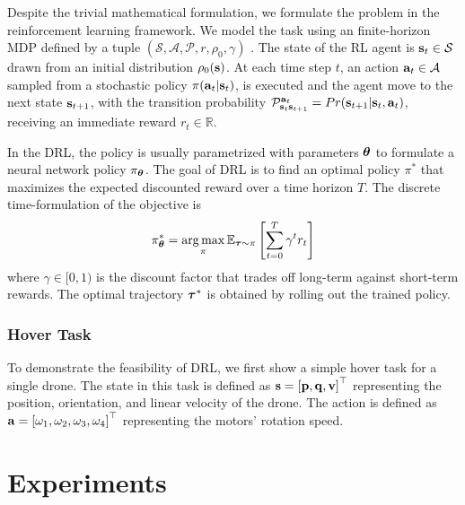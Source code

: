 \documentclass[letterpaper,journal,twoside]{IEEEtran}
\begin{document}
Despite the trivial mathematical formulation, 
we formulate the problem in the reinforcement learning 
framework. 
We model the task using an finite-horizon MDP 
defined by a tuple $\left(
  \mathcal{S}, 
  \mathcal{A}, 
  \mathcal{P}, 
  r, \rho_0, \gamma
\right)$ \cite{sutton2018reinforcement}.
The state of the RL agent is 
$\mathbf{s}_t \in \mathcal{S}$ drawn from 
an initial distribution $\rho_0(\mathbf{s})$.
At each time step $t$, an action $\mathbf{a}_t \in \mathcal{A}$ 
sampled from a stochastic policy $\pi(\mathbf{a}_t | \mathbf{s}_t)$, 
is executed and the agent move to the next state $\mathbf{s}_{t+1}$, 
with the transition probability $\mathcal{P}^{\mathbf{a}_t}_{\mathbf{s}_t\mathbf{s}_{t+1}} = Pr(\mathbf{s}_{t+1} | \mathbf{s}_t, \mathbf{a}_t)$, receiving 
an immediate reward $r_t \in \mathbb{R}$.

In the DRL, the policy is usually parametrized with parameters $\boldsymbol{\theta}$ to formulate a neural network policy $\pi_{\boldsymbol{\theta}}$.
The goal of DRL is to find an optimal policy $\pi^*$ that 
maximizes the expected discounted reward over a time horizon $T$.
The discrete time-formulation of the objective is 
\begin{equation}
  \label{eq:rl_objective}
  \pi^*_{\boldsymbol{\theta}} = \operatorname*{arg\,max}_{\pi} \mathbb{E}_{\boldsymbol{\tau} \sim \pi}
  \left[
    \sum_{t=0}^T \gamma^t r_t
  \right]
\end{equation}
where $\gamma \in [0,1)$ is the discount factor that 
trades off long-term against short-term rewards.
The optimal trajectory $\boldsymbol{\tau}^*$ is obtained by rolling 
out the trained policy.

\subsubsection{Hover Task}
To demonstrate the feasibility of DRL, we first show 
a simple hover task for a single drone.
The state in this task is defined as 
$\mathbf{s} = \left[ \mathbf{p}, \mathbf{q}, \mathbf{v} \right]^\top$ 
representing the position, orientation, and linear velocity
of the drone.
The action is defined as 
$\mathbf{a} = \left[ \omega_1, \omega_2, \omega_3, \omega_4 \right]^\top$
representing the motors' rotation speed.



\section{Experiments}







\end{document}
